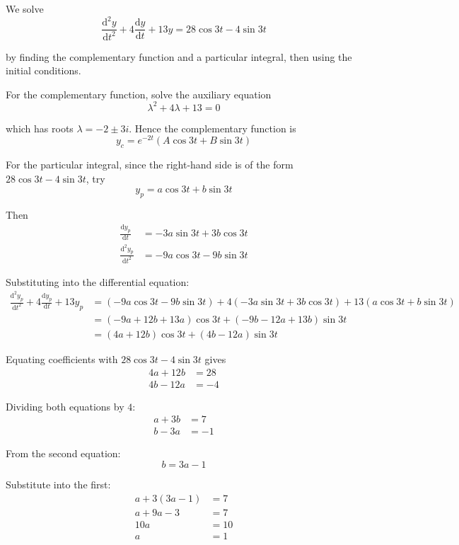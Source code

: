 \documentclass[leqno]{article}
\begin{document}
\begin{enumerate}[
  label=\textbf{\arabic*.},
  leftmargin=*,
  topsep=0pt,
  partopsep=0pt,
  parsep=0pt
]
\vspace*{10pt}

\begin{djsSolution}
We solve
\[
\frac{\mathrm{d}^2y}{\mathrm{d}t^2}+4\frac{\mathrm{d}y}{\mathrm{d}t}+13y=28\cos 3t-4\sin 3t
\]

by finding the complementary function and a particular integral, then using the initial conditions.

For the complementary function, solve the auxiliary equation
\[
\lambda^2+4\lambda+13=0
\]

which has roots $\lambda=-2\pm 3i$. Hence the complementary function is
\[
y_c=e^{-2t}(A\cos 3t+B\sin 3t)
\]

For the particular integral, since the right-hand side is of the form $28\cos 3t-4\sin 3t$, try
\[
y_p=a\cos 3t+b\sin 3t
\]

Then
\begin{align*}
\frac{\mathrm{d}y_p}{\mathrm{d}t}&=-3a\sin 3t+3b\cos 3t \\
\frac{\mathrm{d}^2y_p}{\mathrm{d}t^2}&=-9a\cos 3t-9b\sin 3t
\end{align*}

Substituting into the differential equation:
\begin{align*}
\frac{\mathrm{d}^2y_p}{\mathrm{d}t^2}+4\frac{\mathrm{d}y_p}{\mathrm{d}t}+13y_p
&=\left(-9a\cos 3t-9b\sin 3t\right)+4\left(-3a\sin 3t+3b\cos 3t\right)+13\left(a\cos 3t+b\sin 3t\right) \\
&=\left(-9a+12b+13a\right)\cos 3t+\left(-9b-12a+13b\right)\sin 3t \\
&=(4a+12b)\cos 3t+(4b-12a)\sin 3t
\end{align*}

Equating coefficients with $28\cos 3t-4\sin 3t$ gives
\begin{align*}
4a+12b&=28 \\
4b-12a&=-4
\end{align*}

Dividing both equations by $4$:
\begin{align*}
a+3b&=7 \\
b-3a&=-1
\end{align*}

From the second equation:
\[
b=3a-1
\]

Substitute into the first:
\begin{align*}
a+3(3a-1)&=7 \\
a+9a-3&=7 \\
10a&=10 \\
a&=1
\end{align*}


\end{djsSolution}
\end{enumerate}
\end{document}
